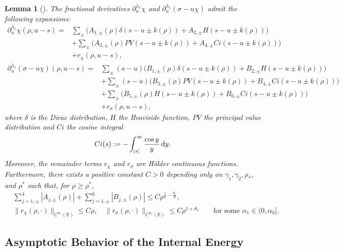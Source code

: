 \documentclass[reqno,11pt]{amsart}
\numberwithin{equation}{section}
\newtheorem{lemma}[theorem]{Lemma}
\theoremstyle{definition}
\def\dd{{\, \rm d}}
\begin{document}
    \begin{lemma}[]\label{singularity}
  The fractional derivatives $\partial_u^{\lambda_1} \chi$ and $\partial_u^{\lambda_1} (\sigma - u \chi)$ admit the following expansions{\rm:}
 \begin{align*}
 \partial_u^{\lambda_1} \chi(\rho,u - s) = & \sum_{\pm} \Big ( A_{1,\pm}(\rho) \delta (s-u \pm k(\rho) ) + A_{2,\pm} H(s-u \pm k(\rho)) \Big ) \\
 & + \sum_{\pm} \Big ( A_{3,\pm}(\rho) PV (s-u \pm k(\rho) ) + A_{4,\pm} Ci(s-u \pm k(\rho)) \Big ) \\
  & + r_\chi(\rho,u - s),
 \end{align*}
 \begin{align*}
 \partial_u^{\lambda_1} (\sigma - u \chi)(\rho,u - s) = & \sum_{\pm}(s-u) \Big ( B_{1,\pm}(\rho) \delta (s-u \pm k(\rho) ) + B_{2,\pm} H(s-u \pm k(\rho)) \Big ) \\
 & + \sum_{\pm}(s-u) \Big ( B_{3,\pm}(\rho) PV (s-u \pm k(\rho) ) + B_{4,\pm} Ci(s-u \pm k(\rho)) \Big ) \\
 & + \sum_{\pm} \Big ( B_{5,\pm}(\rho) H (s-u \pm k(\rho) ) + B_{6,\pm} Ci(s-u \pm k(\rho)) \Big ) \\
  & + r_\sigma(\rho,u - s),
\end{align*}
where $\delta$ is the Dirac distribution, $H$ the Heaviside function, $PV$ the principal value distribution and $Ci$ the cosine integral
\[
 Ci(s) := - \int^\infty_{|s|} \frac{\cos y}{y} \dd y.
 \]
Moreover, the remainder terms $r_\chi$ and $r_\sigma$ are H\"older continuous functions.
Furthermore, there exists a positive constant $C>0$ depending only on $\gamma_1,\gamma_2,\rho_*$, 
and $\rho^*$ such that, for $\rho \geq \rho^*$,
\begin{align*}
 &\sum_{j=1,\pm}^4 |A_{j,\pm}(\rho)| + \sum_{j=1,\pm}^6 |B_{j,\pm}(\rho)| \leq C \rho^{\frac{1}{2} - \frac{\theta_2}{2}},\\
 &\| r_\chi(\rho,\cdot) \|_{C^{\alpha_1}(\mathbb{R})} \leq C\rho, \quad \| r_\sigma(\rho,\cdot) \|_{C^{\alpha_1}(\mathbb{R})} \leq C\rho^{1 + \theta_2}
  \qquad\mbox{for some $\alpha_1 \in (0,\alpha_0]$}.
  \end{align*}  
 \end{lemma}

\subsection{Asymptotic Behavior of the Internal Energy}
\end{document}
